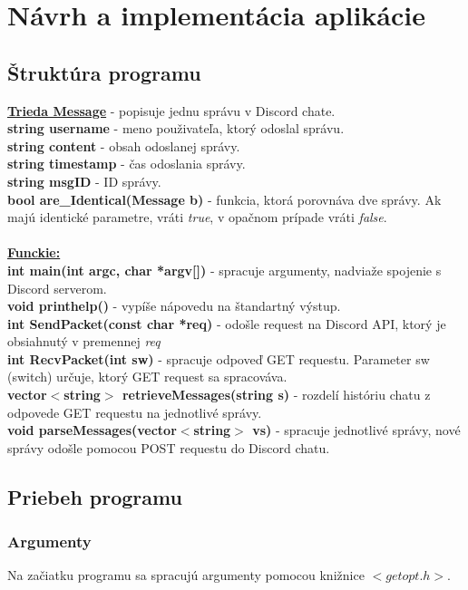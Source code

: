 \documentclass[11pt,a4paper]{article}
\begin{document}
	\section{Návrh a implementácia aplikácie}
	\subsection{Štruktúra programu}
	\underline{\textbf{Trieda Message}} - popisuje jednu správu v Discord chate.\\
	\textbf{string username} - meno použivateľa, ktorý odoslal správu.\\
   	\textbf{string content} - obsah odoslanej správy.\\
  	\textbf{string timestamp} - čas odoslania správy.\\
   	\textbf{string msgID} - ID správy.\\
   	\textbf{bool are\_Identical(Message b)} - funkcia, ktorá porovnáva dve správy. Ak majú identické parametre, vráti \emph{true}, v opačnom prípade vráti \emph{false}.\\
   	\\\underline{\textbf{Funckie:}}\\
   	\textbf{int main(int argc, char *argv[])} - spracuje argumenty, nadviaže spojenie s Discord serverom.\\
   	\textbf{void printhelp()} - vypíše nápovedu na štandartný výstup.\\
   	\textbf{int SendPacket(const char *req)} - odošle request na Discord API, ktorý je obsiahnutý v premennej \emph{\*req}\\
   	\textbf{int RecvPacket(int sw)} - spracuje odpoveď GET requestu. Parameter sw (switch) určuje, ktorý GET request sa spracováva.\\
   	\textbf{vector$<$string$>$ retrieveMessages(string s)} - rozdelí históriu chatu z odpovede GET requestu na jednotlivé správy.\\
   	\textbf{void parseMessages(vector$<$string$>$ vs)} - spracuje jednotlivé správy, nové správy odošle pomocou POST requestu do Discord chatu.
   	
	\subsection{Priebeh programu}
	\subsubsection{Argumenty}
	Na začiatku programu sa spracujú argumenty pomocou knižnice $<getopt.h>$.
\end{document}
